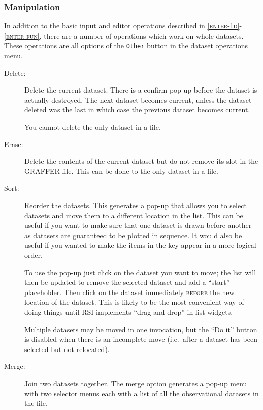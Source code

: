\documentclass[11pt,twoside,english]{article}
\begin{document}
\begin{description}
\end{description}

\subsubsection{Manipulation}

In addition to the basic input and editor operations described in
\textsc{\autoref{enter-1d}-\autoref{enter-fun}}, there are a number of
operations which work on whole datasets. These operations are all
options of the \texttt{Other} button in the dataset operations menu.

\begin{description}
\item [Delete:]Delete the current dataset. There is a confirm pop-up
  before the dataset is actually destroyed. The next dataset becomes
  current, unless the dataset deleted was the last in which case the
  previous dataset becomes current.


  You cannot delete the only dataset in a file.

\item [Erase:]Delete the contents of the current dataset but do not
  remove its slot in the GRAFFER file. This can be done to the only
  dataset in a file.
\item [Sort:]Reorder the datasets. This generates a pop-up that allows
  you to select datasets and move them to a different location in the
  list. This can be useful if you want to make sure that one dataset is
  drawn before another as datasets are guaranteed to be plotted in
  sequence. It would also be useful if you wanted to make the items in
  the key appear in a more logical order.


  To use the pop-up just click on the dataset you want to move; the
  list will then be updated to remove the selected dataset and add a
  ``start'' placeholder. Then click on the dataset immediately
  \textsc{before} the new location of the dataset. This is likely to be
  the most convenient way of doing things until RSI implements
  ``drag-and-drop'' in list widgets.

  Multiple datasets may be moved in one invocation, but the ``Do it''
  button is disabled when there is an incomplete move (i.e.\ after a
  dataset has been selected but not relocated).

\item [Merge:]Join two datasets together. The merge option generates a
  pop-up menu with two selector menus each with a list of all the
  observational datasets in the file.



\end{description}
\end{document}
